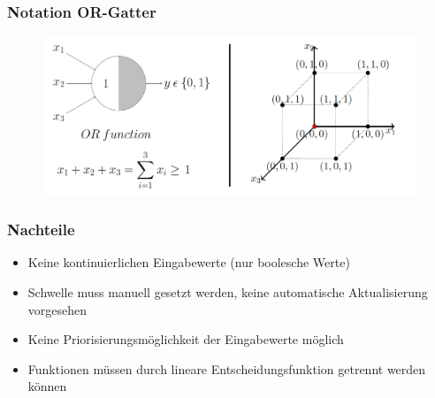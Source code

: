 \begin{frame}
\frametitle{Notation OR-Gatter}

\begin{figure}
	\includegraphics[width=\linewidth]{./geschichtliches/mcCullochPittsNeuron/img/mpn_or_alpha}
\end{figure}
\end{frame}


\begin{frame}
\frametitle{Nachteile}

\begin{itemize}
\item Keine kontinuierlichen Eingabewerte (nur boolesche Werte)
\item Schwelle muss manuell gesetzt werden, keine automatische Aktualisierung vorgesehen
\item Keine Priorisierungsmöglichkeit der Eingabewerte möglich
\item Funktionen müssen durch lineare Entscheidungsfunktion getrennt werden können
\end{itemize}

\end{frame}
